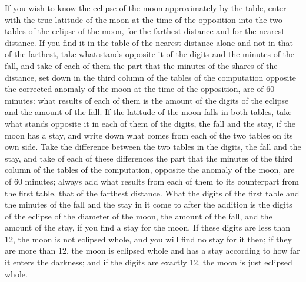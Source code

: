 \documentclass[11pt]{article}
\begin{document}
\par If you wish to know the eclipse of the moon approximately by the table, enter with the true latitude of the moon at the time of the opposition into the two tables of the eclipse of the moon, for the farthest distance and for the nearest distance. If you find it in the table of the nearest distance alone and not in that of the farthest, take what stands opposite it of the digits and the minutes of the fall, and take of each of them the part that the minutes of the shares of the distance, set down in the third column of the tables of the computation opposite the corrected anomaly of the moon at the time of the opposition, are of 60 minutes: what results of each of them is the amount of the digits of the eclipse and the amount of the fall. If the latitude of the moon falls in both tables, take what stands opposite it in each of them of the digits, the fall and the stay, if the moon has a stay, and write down what comes from each of the two tables on its own side. Take the difference between the two tables in the digits, the fall and the stay, and take of each of these differences the part that the minutes of the third column of the tables of the computation, opposite the anomaly of the moon, are of 60 minutes; always add what results from each of them to its counterpart from the first table, that of the farthest distance. What the digits of the first table and the minutes of the fall and the stay in it come to after the addition is the digits of the eclipse of the diameter of the moon, the amount of the fall, and the amount of the stay, if you find a stay for the moon. If these digits are less than 12, the moon is not eclipsed whole, and you will find no stay for it then; if they are more than 12, the moon is eclipsed whole and has a stay according to how far it enters the darkness; and if the digits are exactly 12, the moon is just eclipsed whole.\par
\end{document}
